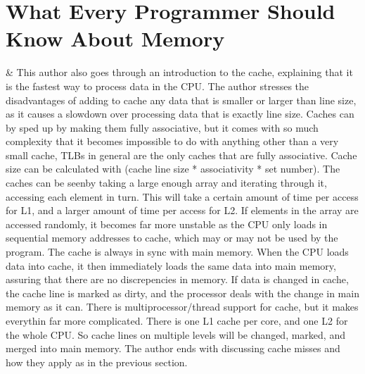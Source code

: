 \documentclass[letterpaper,10pt,titlepage]{article}
\begin{document}
\pagebreak

\section{What Every Programmer Should Know About Memory}
    & This author also goes through an introduction to the cache, explaining that it is the fastest way to process data in the CPU. 
    The author stresses the disadvantages of adding to cache any data that is smaller or larger than line size, as it causes a slowdown
    over processing data that is exactly line size. Caches can by sped up by making them fully associative, but it comes with so much complexity 
    that it becomes impossible to do with anything other than a very small cache, TLBs in general are the only caches that are fully 
    associative. Cache size can be calculated with (cache line size * associativity * set number). The caches can be seenby taking a large 
    enough array and iterating through it, accessing each element in turn. This will take a certain amount of time per access for L1, and a 
    larger amount of time per access for L2. If elements in the array are accessed randomly, it becomes far more unstable as the 
    CPU only loads in sequential memory addresses to cache, which may or may not be used by the program. The cache is always in sync with 
    main memory. When the CPU loads data into cache, it then immediately loads the same data into main memory, assuring that there are no 
    discrepencies in memory. If data is changed in cache, the cache line is marked as dirty, and the processor deals with the change in main 
    memory as it can. There is multiprocessor/thread support for cache, but it makes everythin far more complicated. There is one L1 cache 
    per core, and one L2 for the whole CPU. So cache lines on multiple levels will be changed, marked, and merged into main memory. The author 
    ends with discussing cache misses and how they apply as in the previous section. 
    
\pagebreak
\end{document}
